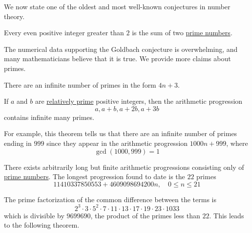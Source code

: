 \documentclass{article}
\newcounter{theorem}[section]
\newcounter{example}[section]
\begin{document}
We now state one of the oldest and most well-known conjectures in number theory. 

\begin{theorem}
  \label{thm:goldbach-conjecture-1742}
Every even positive integer greater than $2$ is the sum of two \hyperref[def:prime-number]{prime numbers}. 
\end{theorem}
The numerical data supporting the Goldbach conjecture is overwhelming, and many mathematicians believe that it is true. We provide more claims about primes. 

\begin{theorem}
  \label{thm:infinitude-of-primes-of-the-form-4n3}
There are an infinite number of primes in the form $4n + 3$. 
\end{theorem}

\begin{theorem}[Dirichlet]
  \label{thm:dirichlet}
If $a$ and $b$ are \hyperref[def:relatively-prime]{relatively prime} positive integers, then the arithmetic progression
\begin{equation}
  a, a + b, a + 2b, a + 3b
\end{equation}
contains infinite many primes. 
\end{theorem}

For example, this theorem tells us that there are an infinite number of primes ending in $999$ since they appear in the arithmetic progression $1000n + 999$, where 
  \begin{equation}
    \gcd(1000, 999) = 1
  \end{equation}

\begin{theorem}
  \label{thm:arbitrarily-long-arithmetic-progressions-of}
There exists arbitrarily long but finite arithmetic progressions consisting only of \hyperref[def:prime-number]{prime numbers}. The longest progression found to date is the $22$ primes
\begin{equation}
  11410337850553 + 4609098694200 n, \quad 0 \leq n \leq 21
\end{equation}
\end{theorem}
The prime factorization of the common difference between the terms is 
\begin{equation}
  2^3 \cdot 3 \cdot 5^2 \cdot 7 \cdot 11 \cdot 13 \cdot 17 \cdot 19 \cdot 23 \cdot 1033
\end{equation}
which is divisible by $9699690$, the product of the primes less than $22$. This leads to the following theorem. 
\end{document}

